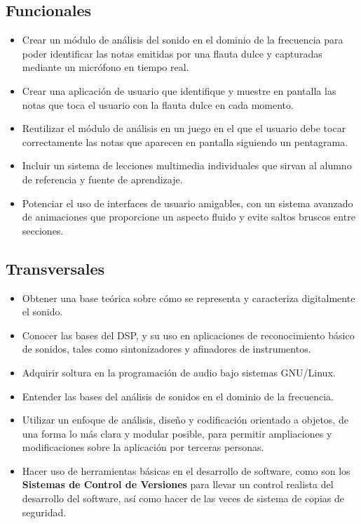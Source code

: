 \subsection{Funcionales}
\begin{itemize}
\item Crear un módulo de análisis del sonido en el dominio de la frecuencia para
  poder identificar las notas emitidas por una flauta dulce y capturadas
  mediante un micrófono en tiempo real.
\item Crear una aplicación de usuario que identifique y muestre en pantalla las
  notas que toca el usuario con la flauta dulce en cada momento.
\item Reutilizar el módulo de análisis en un juego en el que el
  usuario debe tocar correctamente las notas que aparecen en pantalla
  siguiendo un pentagrama.
\item Incluir un sistema de lecciones multimedia individuales que
  sirvan al alumno de referencia y fuente de aprendizaje.
\item Potenciar el uso de interfaces de usuario amigables, con un
  sistema avanzado de animaciones que proporcione un aspecto fluido y
  evite saltos bruscos entre secciones.
\end{itemize}

\subsection{Transversales}
\begin{itemize}
\item Obtener una base teórica sobre cómo se representa y caracteriza
  digitalmente el sonido.
\item Conocer las bases del \ac{DSP}, y su uso en aplicaciones de
  reconocimiento básico de sonidos, tales como sintonizadores y
  afinadores de instrumentos.
\item Adquirir soltura en la programación de audio bajo sistemas GNU/Linux.
\item Entender las bases del análisis de sonidos en el dominio de la
  frecuencia. 
\item Utilizar un enfoque de análisis, diseño y codificación orientado
  a objetos, de una forma lo más clara y modular posible, para
  permitir ampliaciones y modificaciones sobre la aplicación por
  terceras personas.
\item Hacer uso de herramientas básicas en el desarrollo de software,
  como son los \textbf{Sistemas de Control de Versiones} para llevar
  un control realista del desarrollo del software, así como hacer de
  las veces de sistema de copias de seguridad.
\end{itemize}


